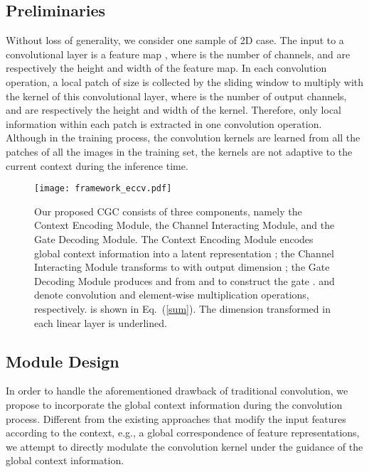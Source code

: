 \documentclass[runningheads]{llncs}
\begin{document}
\subsection{Preliminaries}
Without loss of generality, we consider one sample of 2D case. The input to a convolutional layer is a feature map , where  is the number of channels, and  are respectively the height and width of the feature map. In each convolution operation, a local patch of size  is collected by the sliding window to multiply with the kernel  of this convolutional layer, where  is the number of output channels, and  are respectively the height and width of the kernel. Therefore, only local information within each patch is extracted in one convolution operation. Although in the training process, the convolution kernels are learned from all the patches of all the images in the training set, the kernels are not adaptive to the current context during the inference time.

\begin{figure*}[t]
\begin{center}

\texttt{[image: framework\_eccv.pdf]}
\end{center}
\caption{\label{fig:framework}Our proposed CGC consists of three components, namely the Context Encoding Module, the Channel Interacting Module, and the Gate Decoding Module. The Context Encoding Module encodes global context information into a latent representation ; the Channel Interacting Module transforms  to  with output dimension ; the Gate Decoding Module produces  and  from  and  to construct the gate .  and  denote convolution and element-wise multiplication operations, respectively.  is shown in Eq.~(\ref{sum}). The dimension transformed in each linear layer is underlined.}
\end{figure*}

\subsection{Module Design}
In order to handle the aforementioned drawback of traditional convolution, we propose to incorporate the global context information during the convolution process. Different from the existing approaches that modify the input features according to the context, e.g., a global correspondence of feature representations, we attempt to directly modulate the convolution kernel under the guidance of the global context information.
\end{document}
